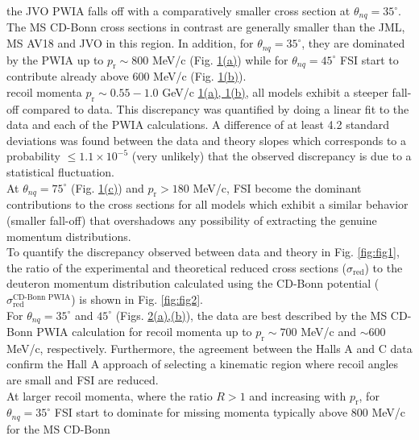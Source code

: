 the JVO PWIA falls off with a comparatively smaller cross section at $\theta_{nq}=35^{\circ}$. The MS CD-Bonn cross sections in contrast are generally smaller than the JML, MS AV18 and JVO in this region.
In addition, for $\theta_{nq}=35^{\circ}$, they are dominated by the PWIA up to $p_{\mathrm{r}}\sim800$ MeV/c
(Fig. \hyperref[fig:fig1]{1(a)})  while for $\theta_{nq}=45^{\circ}$  FSI start to contribute already above 600 MeV/c (Fig. \hyperref[fig:fig1]{1(b)}).\\
\indent \DIFdelbegin {}\DIFdelend \DIFaddbegin {}\DIFaddend recoil momenta $p_{\mathrm{r}} \sim 0.55-1.0$ GeV/c \DIFaddbegin {}\hyperref[fig:fig1]{1(a), 1(b)}\DIFadd{)}\DIFaddend , all models exhibit a
steeper fall-off compared to data. This discrepancy was quantified by doing a linear fit to the data and each of the PWIA calculations. A difference of at least
4.2 standard deviations was found between the data and theory slopes which corresponds to a probability $\leq 1.1\times 10^{-5}$ (very unlikely) that the observed discrepancy is due to a statistical fluctuation. \\ 
\indent At $\theta_{nq}=75^{\circ}$ (Fig. \hyperref[fig:fig1]{1(c)}) and $p_{\mathrm{r}}>180$ MeV/c, FSI become the dominant contributions to the cross sections for all models which exhibit a similar
behavior (smaller fall-off) that overshadows any possibility of extracting the genuine momentum distributions.\\
\indent To quantify the discrepancy observed between data and theory in Fig. \ref{fig:fig1}, the ratio of the experimental and theoretical reduced cross sections ($\sigma_{\mathrm{red}}$) to the
deuteron momentum distribution calculated using the CD-Bonn potential ($\sigma^{\text{CD-Bonn PWIA}}_{\mathrm{red}}$) \cite{PhysRevC.63.024001} is shown in Fig. \ref{fig:fig2}. \\
\indent For $\theta_{nq}=35^{\circ}$ and $45^{\circ}$ (Figs. \hyperref[fig:fig2]{2(a),(b)}), the data are best described by the MS CD-Bonn PWIA calculation for recoil momenta up
to $p_{\mathrm{r}}\sim700$ MeV/c and $\sim600$ MeV/c, respectively. Furthermore, the agreement between the Halls A and C data confirm the Hall A approach of selecting a kinematic
region where recoil angles are small and FSI are reduced. \\
\indent At larger recoil momenta, where the ratio $R>1$ and increasing with $p_{\mathrm{r}}$, for $\theta_{nq}=35^{\circ}$ FSI start to dominate for
missing momenta typically above 800 MeV/c for the MS CD-Bonn
